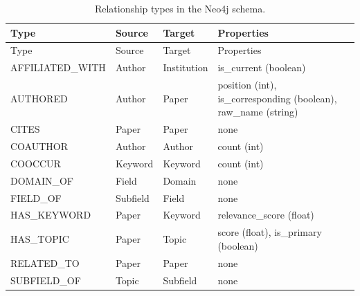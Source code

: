 \documentclass{llmxive}
\begin{document}
\begin{longtable}{p{3cm}p{2.5cm}p{2.5cm}p{5cm}}
\caption{Relationship types in the Neo4j schema.}
\label{tab:relationships} \\

\toprule
Type & Source & Target & { Properties\par} \\
\midrule
\endfirsthead

\toprule
Type & Source & Target & { Properties\par} \\
\midrule
\endhead

\bottomrule
\endfoot

AFFILIATED\_WITH & Author & Institution & { is\_current (boolean)\par} \\
AUTHORED & Author & Paper & { position (int), is\_corresponding (boolean), raw\_name (string)\par} \\
CITES & Paper & Paper & none \\
COAUTHOR & Author & Author & count (int) \\
COOCCUR & Keyword & Keyword & count (int) \\
DOMAIN\_OF & Field & Domain & none \\
FIELD\_OF & Subfield & Field & none \\
HAS\_KEYWORD & Paper & Keyword & { relevance\_score (float)\par} \\
HAS\_TOPIC & Paper & Topic & { score (float), is\_primary (boolean)\par} \\
RELATED\_TO & Paper & Paper & none \\
SUBFIELD\_OF & Topic & Subfield & none \\

\end{longtable}
\end{document}
